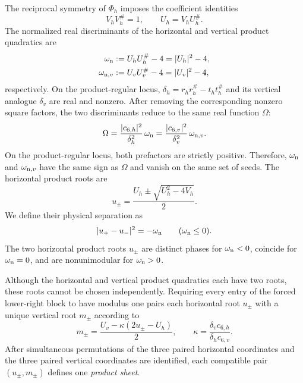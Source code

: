 \documentclass[aps,prx,reprint,nofootinbib,twoside,superscriptaddress,longbibliography,floatfix]{revtex4-2}
\theoremstyle{definition}
\begin{document}
The reciprocal symmetry of $\Phi_h$ imposes the coefficient identities
\begin{equation}
V_hV_h^\#=1,
\qquad
U_h=V_hU_h^\#.
\label{eq:self-inversive-product-data}
\end{equation}
The normalized real discriminants of the horizontal and vertical product quadratics are
\begin{equation}
\begin{aligned}
\omega_{\rm n}&:=U_hU_h^\#-4=|U_h|^2-4,\\
\omega_{{\rm n},v}&:=U_vU_v^\#-4=|U_v|^2-4,
\end{aligned}
\label{eq:normalized-product-discriminants}
\end{equation}
respectively.
On the product-regular locus, $\delta_h=r_hr_h^\#-t_ht_h^\#$ and its vertical analogue $\delta_v$ are real and nonzero. After removing the corresponding nonzero square factors, the two discriminants reduce to the same real function $\Omega$:
\begin{equation}
\Omega=\frac{|c_{6,h}|^2}{\delta_h^2}\,\omega_{\rm n}
=\frac{|c_{6,v}|^2}{\delta_v^2}\,\omega_{{\rm n},v}.
\label{eq:omega-residual-discriminant-bridge}
\end{equation}
On the product-regular locus, both prefactors are strictly positive. Therefore, $\omega_{\rm n}$ and $\omega_{{\rm n},v}$ have the same sign as $\Omega$ and vanish on the same set of seeds. The horizontal product roots are
\begin{equation}
u_\pm=\frac{U_h\pm\sqrt{U_h^2-4V_h}}{2}.
\label{eq:horizontal-product-roots}
\end{equation}
We define their physical separation as
\begin{equation}
    |u_+-u_-|^2=-\omega_{\rm n}\qquad(\omega_{\rm n}\leq0).
\end{equation}
The two horizontal product roots $u_\pm$ are distinct phases for $\omega_{\rm n}<0$, coincide for $\omega_{\rm n}=0$, and are nonunimodular for $\omega_{\rm n}>0$.

Although the horizontal and vertical product quadratics each have two roots, these roots cannot be chosen independently. Requiring every entry of the forced lower-right block to have modulus one pairs each horizontal root $u_\pm$ with a unique vertical root $m_\pm$ according to
\begin{equation}
m_\pm=\frac{U_v-\kappa(2u_\pm-U_h)}{2},
\qquad
\kappa=\frac{\delta_vc_{6,h}}{\delta_hc_{6,v}}.
\label{eq:affine-minus-matching-main}
\end{equation}
After simultaneous permutations of the three paired horizontal coordinates and the three paired vertical coordinates are identified, each compatible pair $(u_\pm,m_\pm)$ defines one \emph{product sheet}. 
\end{document}
